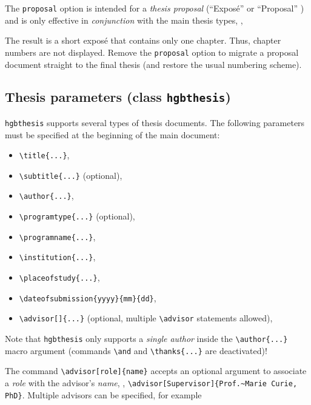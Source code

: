 \documentclass[english]{hgbarticle}
\begin{document}
The \texttt{proposal} option is intended for a \emph{thesis proposal} (``Exposé'' or ``Proposal'' ) and is 
only effective in \emph{conjunction} with the main thesis types, \eg,
%
%
The result is a short exposé that contains only one chapter. Thus,
chapter numbers are not displayed. Remove the \texttt{proposal} option to
migrate a proposal document straight to the final thesis (and restore the usual
numbering scheme).

\subsection{Thesis parameters (class \texttt{hgbthesis})}

\texttt{hgbthesis} supports several types of thesis documents. The following
parameters must be specified at the beginning of the main document:
%
\begin{itemize}
    \item \verb!\title{...}!,
    \item \verb!\subtitle{...}! (optional),
    \item \verb!\author{...}!,
    \item \verb!! (optional), 
    \item \verb!!,
    \item \verb!!,
    \item \verb!!,
    \item \verb!!,
    \item \verb!! (optional, multiple \verb!\advisor! statements allowed),
\end{itemize}
%
Note that \texttt{hgbthesis} only supports a \emph{single author} inside the
\verb!\author{...}! macro argument (commands \verb!\and! and
\verb!\thanks{...}! are deactivated)!

The command \verb!! accepts an optional argument to associate a \emph{role} 
with the advisor's \emph{name}, \eg, \verb!!.
Multiple advisors can be specified, for example
\begin{LaTeXCode}[numbers=none]
\end{LaTeXCode}
\end{document}
